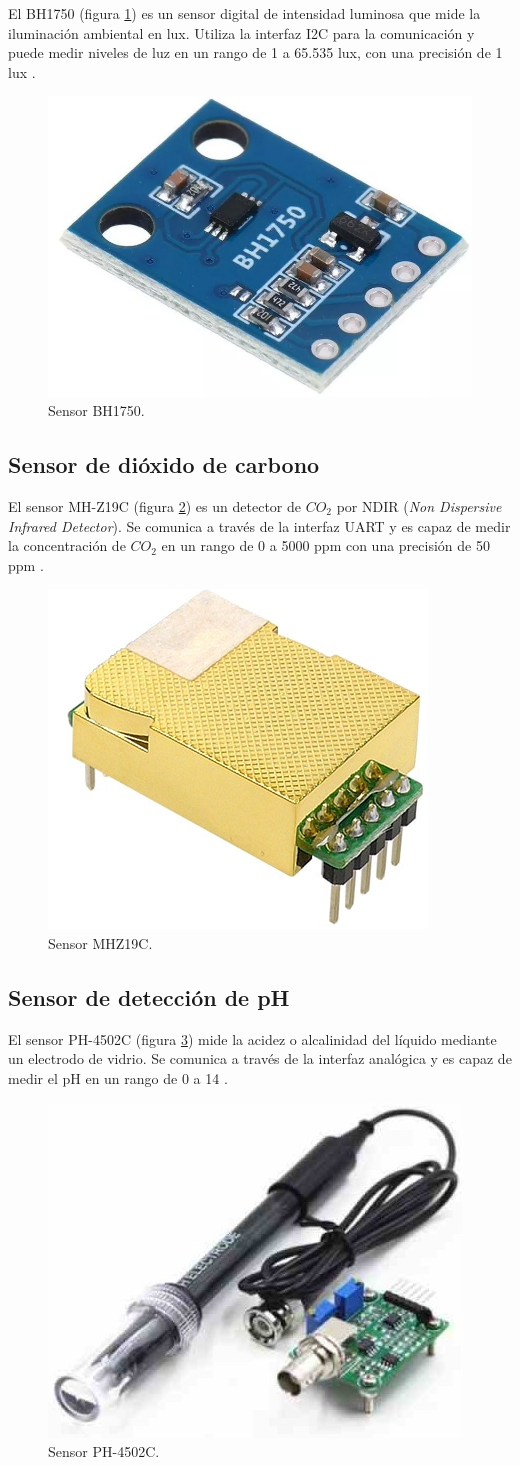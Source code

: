 El BH1750 (figura \ref{fig:BH1750}) es un sensor digital de intensidad luminosa
que mide la iluminación ambiental en lux. Utiliza la interfaz I2C para la
comunicación y puede medir niveles de luz en un rango de 1 a 65.535 lux, con
una precisión de 1 lux \cite{ROHM_BH1750}.

\begin{figure}[H]
	\centering
	\includegraphics[width=.12\textwidth]{./Images/5.png}
	\caption{Sensor BH1750.}
	\label{fig:BH1750}
\end{figure}

\subsection{Sensor de dióxido de carbono}

El sensor MH-Z19C (figura \ref{fig:MHZ19C}) es un detector de $CO_2$ por NDIR
(\textit{Non Dispersive Infrared Detector}). Se comunica a través de la
interfaz UART y es capaz de medir la concentración de $CO_2$ en un rango de 0 a
5000 ppm con una precisión de 50 ppm \cite{WINSEN_MHZ19C}.

\begin{figure}[H]
	\centering
	\includegraphics[width=.10\textwidth]{./Images/6.png}
	\caption{Sensor MHZ19C.}
	\label{fig:MHZ19C}
\end{figure}

\subsection{Sensor de detección de pH}

El sensor PH-4502C (figura \ref{fig:PH4502C}) mide la acidez o alcalinidad del
líquido mediante un electrodo de vidrio. Se comunica a través de la interfaz
analógica y es capaz de medir el pH en un rango de 0 a 14 \cite{PH-4502C}.

\begin{figure}[H]
	\centering
	\includegraphics[width=.15\textwidth]{./Images/7.png}
	\caption{Sensor PH-4502C.}
	\label{fig:PH4502C}
\end{figure}

